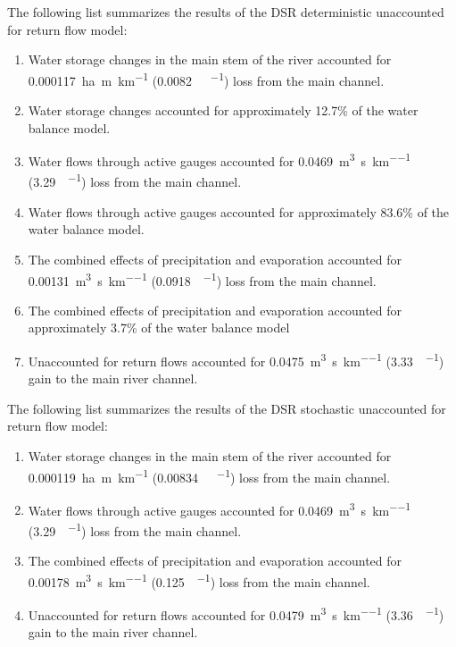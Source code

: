 The following list summarizes the results of the DSR deterministic unaccounted for return flow model:
\begin{enumerate}
	\item Water storage changes in the main stem of the river accounted for \SI{0.000117}{\hectare\m\per\kilo\meter} (\SI{0.0082}{\acre\foot\per\mile}) loss from the main channel.
	\item Water storage changes accounted for approximately 12.7\% of the water balance model.
	\item Water flows through active gauges accounted for \SI{0.0469}{\cubic\m\per\second\per\kilo\meter} (\SI{3.29}{\cfs\per\mile}) loss from the main channel.
	\item Water flows through active gauges accounted for approximately 83.6\% of the water balance model.
	\item The combined effects of precipitation and evaporation accounted for \SI{0.00131}{\cubic\m\per\second\per\kilo\meter} (\SI{0.0918}{\cfs\per\mile}) loss from the main channel.
	\item The combined effects of precipitation and evaporation accounted for approximately 3.7\% of the water balance model
	\item Unaccounted for return flows accounted for \SI{0.0475}{\cubic\m\per\second\per\kilo\meter} (\SI{3.33}{\cfs\per\mile}) gain to the main river channel.
\end{enumerate}

The following list summarizes the results of the DSR stochastic unaccounted for return flow model:
\begin{enumerate}
	\item Water storage changes in the main stem of the river accounted for \SI{0.000119}{\hectare\m\per\kilo\meter} (\SI{0.00834}{\acre\foot\per\mile}) loss from the main channel.
	\item Water flows through active gauges accounted for \SI{0.0469}{\cubic\m\per\second\per\kilo\meter} (\SI{3.29}{\cfs\per\mile}) loss from the main channel.
	\item The combined effects of precipitation and evaporation accounted for \SI{0.00178}{\cubic\m\per\second\per\kilo\meter} (\SI{0.125}{\cfs\per\mile}) loss from the main channel.
	\item Unaccounted for return flows accounted for \SI{0.0479}{\cubic\m\per\second\per\kilo\meter} (\SI{3.36}{\cfs\per\mile}) gain to the main river channel.
\end{enumerate}

